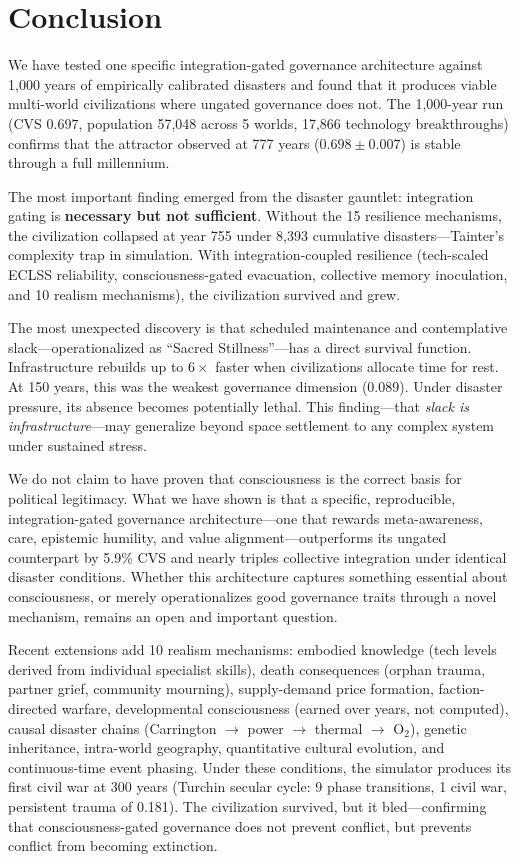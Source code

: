 \documentclass[12pt,a4paper]{article}
\begin{document}
\section{Conclusion}

We have tested one specific integration-gated governance architecture against 1,000 years of empirically calibrated disasters and found that it produces viable multi-world civilizations where ungated governance does not. The 1,000-year run (CVS $0.697$, population 57,048 across 5 worlds, 17,866 technology breakthroughs) confirms that the attractor observed at 777 years ($0.698 \pm 0.007$) is stable through a full millennium.

The most important finding emerged from the disaster gauntlet: integration gating is \textbf{necessary but not sufficient}. Without the 15 resilience mechanisms, the civilization collapsed at year 755 under 8,393 cumulative disasters---Tainter's complexity trap \citep{tainter1988collapse} in simulation. With integration-coupled resilience (tech-scaled ECLSS reliability, consciousness-gated evacuation, collective memory inoculation, and 10 realism mechanisms), the civilization survived and grew.

The most unexpected discovery is that scheduled maintenance and contemplative slack---operationalized as ``Sacred Stillness''---has a direct survival function. Infrastructure rebuilds up to $6\times$ faster when civilizations allocate time for rest. At 150 years, this was the weakest governance dimension (0.089). Under disaster pressure, its absence becomes potentially lethal. This finding---that \emph{slack is infrastructure}---may generalize beyond space settlement to any complex system under sustained stress.

We do not claim to have proven that consciousness is the correct basis for political legitimacy. What we have shown is that a specific, reproducible, integration-gated governance architecture---one that rewards meta-awareness, care, epistemic humility, and value alignment---outperforms its ungated counterpart by 5.9\% CVS and nearly triples collective integration under identical disaster conditions. Whether this architecture captures something essential about consciousness, or merely operationalizes good governance traits through a novel mechanism, remains an open and important question.

Recent extensions add 10 realism mechanisms: embodied knowledge (tech levels derived from individual specialist skills), death consequences (orphan trauma, partner grief, community mourning), supply-demand price formation, faction-directed warfare, developmental consciousness (earned over years, not computed), causal disaster chains (Carrington $\rightarrow$ power $\rightarrow$ thermal $\rightarrow$ O$_2$), genetic inheritance, intra-world geography, quantitative cultural evolution, and continuous-time event phasing. Under these conditions, the simulator produces its first civil war at 300 years (Turchin secular cycle: 9 phase transitions, 1 civil war, persistent trauma of 0.181). The civilization survived, but it bled---confirming that consciousness-gated governance does not prevent conflict, but prevents conflict from becoming extinction.
\end{document}

